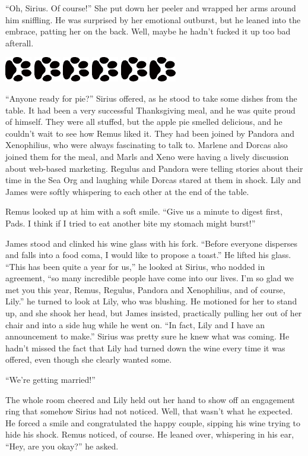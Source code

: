 \documentclass[12pt,twoside,openright]{memoir}
\newcommand{\myrulez}{	
	\begin{center}
		\hspace{.5em}
		\includegraphics[angle=60]{dogprint.pdf}
		\hspace{.5em}
		\includegraphics[angle=120]{dogprint.pdf}
		\hspace{.5em}
		\includegraphics[angle=60]{dogprint.pdf}
		\hspace{.5em}
		\includegraphics[angle=120]{dogprint.pdf}
		\hspace{.5em}
		\includegraphics[angle=60]{dogprint.pdf}
		\hspace{.5em}
		\includegraphics[angle=120]{dogprint.pdf}
		\hspace{.5em}
	\end{center}
}
\begin{document}
``Oh, Sirius. Of course!'' She put down her peeler and wrapped her arms around him sniffling. He was surprised by her emotional outburst, but he leaned into the embrace, patting her on the back. Well, maybe he hadn't fucked it up too bad afterall.

\myrulez

``Anyone ready for pie?'' Sirius offered, as he stood to take some dishes from the table. It had been a very successful Thanksgiving meal, and he was quite proud of himself. They were all stuffed, but the apple pie smelled delicious, and he couldn't wait to see how Remus liked it. They had been joined by Pandora and Xenophilius, who were always fascinating to talk to. Marlene and Dorcas also joined them for the meal, and Marls and Xeno were having a lively discussion about web-based marketing. Regulus and Pandora were telling stories about their time in the Sea Org and laughing while Dorcas stared at them in shock. Lily and James were softly whispering to each other at the end of the table.

Remus looked up at him with a soft smile. ``Give us a minute to digest first, Pads. I think if I tried to eat another bite my stomach might burst!''

James stood and clinked his wine glass with his fork. ``Before everyone disperses and falls into a food coma, I would like to propose a toast.'' He lifted his glass. ``This has been quite a year for us,'' he looked at Sirius, who nodded in agreement, ``so many incredible people have come into our lives. I'm so glad we met you this year, Remus, Regulus, Pandora and Xenophilius, and of course, Lily.'' he turned to look at Lily, who was blushing. He motioned for her to stand up, and she shook her head, but James insisted, practically pulling her out of her chair and into a side hug while he went on. ``In fact, Lily and I have an announcement to make.'' Sirius was pretty sure he knew what was coming. He hadn't missed the fact that Lily had turned down the wine every time it was offered, even though she clearly wanted some. 

``We're getting married!'' 

The whole room cheered and Lily held out her hand to show off an engagement ring that somehow Sirius had not noticed. Well, that wasn't what he expected. He forced a smile and congratulated the happy couple, sipping his wine trying to hide his shock. Remus noticed, of course. He leaned over, whispering in his ear, ``Hey, are you okay?'' he asked.
\end{document}
